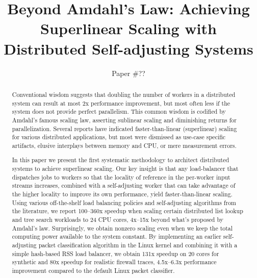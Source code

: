 \documentclass[letterpaper,twocolumn,10pt]{article}
\begin{document}


\title{Beyond Amdahl's Law: Achieving Superlinear Scaling with Distributed Self-adjusting Systems}

\author{Paper \#??} %

\maketitle

\begin{abstract}
  Conventional wisdom suggests that doubling the number of workers in a distributed system can result at most 2x performance improvement, but most often less if the system does not provide perfect parallelism.  This common wisdom is codified by Amdahl's famous scaling law, asserting sublinear scaling and diminishing returns for parallelization. Several reports have indicated faster-than-linear (superlinear) scaling for various distributed applications, but most were dismissed as use-case specific artifacts, elusive interplays between memory and CPU, or mere measurement errors.

  In this paper we present the first systematic methodology to architect distributed systems to achieve superlinear scaling. Our key insight is that any load-balancer that dispatches jobs to workers so that the locality of reference in the per-worker input streams increases, combined with a self-adjusting worker that can take advantage of the higher locality to improve its own performance, yield faster-than-linear scaling. Using various off-the-shelf load balancing policies and self-adjusting algorithms from the literature, we report 100--360x speedup when scaling certain distributed list lookup and tree search workloads to 24 CPU cores, 4x--15x beyond what's proposed by Amdahl's law.  Surprisingly, we obtain nonzero scaling even when we keep the total computing power available to the system constant. By implementing an earlier self-adjusting packet classification algorithm in the Linux kernel and combining it with a simple hash-based RSS load balancer, we obtain 131x speedup on 20 cores for synthetic and 80x speedup for realistic firewall traces, 4.5x--6.3x performance improvement compared to the default Linux packet classifier.
\end{abstract}
\end{document}
